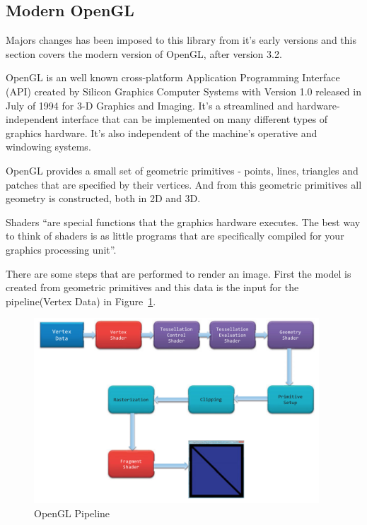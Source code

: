 
\subsection{Modern OpenGL} %
\label{sub:modern_opengl}

Majors changes has been imposed to this library from it's early versions and this section covers the modern version of OpenGL, after version 3.2.

OpenGL is an well known cross-platform Application Programming Interface (API) created by Silicon Graphics Computer Systems with Version 1.0 released in July of 1994 for 3-D Graphics and Imaging. It's a streamlined and hardware-independent interface that can be implemented on many different types of graphics hardware. It's also independent of the machine's operative and windowing systems.

OpenGL provides a small set of geometric primitives - points, lines, triangles and patches that are specified by their vertices. And from this geometric primitives all geometry is constructed, both in 2D and 3D. 

Shaders ``are special functions that the graphics hardware executes. The best way to think of shaders is as little programs that are specifically compiled for your graphics processing unit''. \cite{shreiner2013opengl}

There are some steps that are performed to render an image. First the model is created from geometric primitives and this data is the input  for the pipeline(Vertex Data) in Figure~\ref{fig:OGLPipeline}. 

\begin{figure}[htbp]
	\centering
	\includegraphics[width=0.95\textwidth]{img/OpenGL/pipeline.png}
	\caption{OpenGL Pipeline \cite{shreiner2013opengl}}
	\label{fig:OGLPipeline}
\end{figure}


